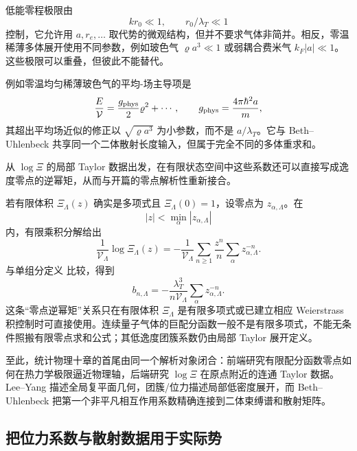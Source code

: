 低能零程极限由
\[
 kr_0\ll1,
 \qquad
 r_0/\lambda_T\ll1
\]
控制，它允许用 \(a,r_e,\ldots\) 取代势的微观结构，但并不要求气体非简并。相反，零温稀薄多体展开使用不同参数，例如玻色气 \(\varrho a^3\ll1\) 或弱耦合费米气 \(k_F|a|\ll1\)。这些极限可以重叠，但彼此不能替代。

例如零温均匀稀薄玻色气的平均-场主导项是
\begin{equation}
 \frac{E}{\mathcal V}
 =\frac{g_{\rm phys}}{2}\varrho^2+\cdots,
 \qquad
 g_{\rm phys}=\frac{4\pi\hbar^2a}{m},
 \label{eq:phys-sm-bose-mean-field}
\end{equation}
其超出平均场近似的修正以 \(\sqrt{\varrho a^3}\) 为小参数，而不是 \(a/\lambda_T\)。它与 Beth--Uhlenbeck 共享同一个二体散射长度输入，但属于完全不同的多体重求和。

从 \(\log\Xi\) 的局部 Taylor 数据出发，在有限状态空间中这些系数还可以直接写成逸度零点的逆幂矩，从而与开篇的零点解析性重新接合。

若有限体积 \(\Xi_\Lambda(z)\) 确实是多项式且 \(\Xi_\Lambda(0)=1\)，设零点为 \(z_{\alpha,\Lambda}\)。在
\[
 |z|<\min_\alpha|z_{\alpha,\Lambda}|
\]
内，有限乘积分解给出
\[
 \frac1{\mathcal V_\Lambda}\log\Xi_\Lambda(z)
 =-\frac1{\mathcal V_\Lambda}
 \sum_{n\ge1}\frac{z^n}{n}
 \sum_\alpha z_{\alpha,\Lambda}^{-n}.
\]
与单组分定义 比较，得到
\begin{equation}
 b_{n,\Lambda}
 =-\frac{\lambda_T^3}{n\mathcal V_\Lambda}
 \sum_\alpha z_{\alpha,\Lambda}^{-n}.
 \label{eq:phys-sm-zero-moment-cluster}
\end{equation}
这条“零点逆幂矩”关系只在有限体积 \(\Xi_\Lambda\) 是有限多项式或已建立相应 Weierstrass 积控制时可直接使用。连续量子气体的巨配分函数一般不是有限多项式，不能无条件照搬有限零点求和公式；其低逸度团簇系数仍由局部 Taylor 展开定义。

至此，统计物理十章的首尾由同一个解析对象闭合：前端研究有限配分函数零点如何在热力学极限逼近物理轴，后端研究 \(\log\Xi\) 在原点附近的连通 Taylor 数据。Lee--Yang 描述全局复平面几何，团簇/位力描述局部低密度展开，而 Beth--Uhlenbeck 把第一个非平凡相互作用系数精确连接到二体束缚谱和散射矩阵。

\subsection{把位力系数与散射数据用于实际势}
\label{sec:virial-experiments}

